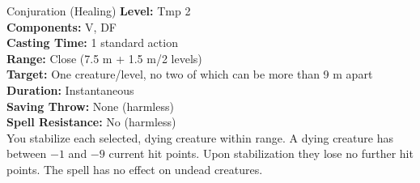 {Conjuration (Healing)}
{
	\textbf{Level:}
	Tmp 2\\
	\textbf{Components:}
	V, DF\\
	\textbf{Casting Time:}
	1 standard action\\
	\textbf{Range:}
	Close (7.5 m + 1.5 m/2 levels)\\
	\textbf{Target:}
	One creature/level, no two of which can be more than 9 m apart\\
	\textbf{Duration:}
	Instantaneous\\
	\textbf{Saving Throw:}
	None (harmless)\\
	\textbf{Spell Resistance:}
	No (harmless)\\
}
{
	You stabilize each selected, dying creature within range. A dying creature has between $-1$ and $-9$ current hit points. Upon stabilization they lose no further hit points. The spell has no effect on undead creatures.
}